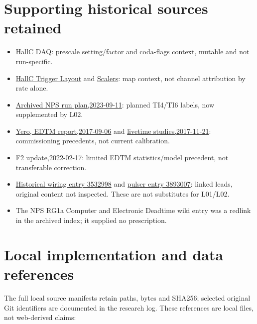 \section{Supporting historical sources retained}
\begin{itemize}
\item \href{https://hallcweb.jlab.org/wiki/index.php?title=Hall_C_DAQ}{HallC DAQ}: prescale setting/factor and coda-flags context, mutable and not run-specific.
\item \href{https://hallcweb.jlab.org/wiki/index.php?title=Hall_C_Trigger_Layout}{HallC Trigger Layout} and \href{https://hallcweb.jlab.org/wiki/index.php?title=Scalers}{Scalers}: map context, not channel attribution by rate alone.
\item \href{https://hallcweb.jlab.org/wiki/images/archive/1/10/20230911123553\%21NPS_DVCS_RunPlan.pdf}{Archived NPS run plan,2023-09-11}: planned TI4/TI6 labels, now supplemented by L02.
\item \href{https://raw.githubusercontent.com/JeffersonLab/Hall-C-Trigger-Setup/master/edtm_studies/EDTM_report.pdf}{Yero, EDTM report,2017-09-06} and \href{https://raw.githubusercontent.com/JeffersonLab/Hall-C-Trigger-Setup/master/edtm_studies/EDTM_LT_Studies.pdf}{livetime studies,2017-11-21}: commissioning precedents, not current calibration.
\item \href{https://indico.jlab.org/event/517/contributions/9310/attachments/7536/10488/F2_HallCwinterCollaboration_2022.pdf}{F2 update,2022-02-17}: limited EDTM statistics/model precedent, not transferable correction.
\item \href{https://logbooks.jlab.org/entry/3532998}{Historical wiring entry 3532998} and \href{https://logbooks.jlab.org/entry/3893007}{pulser entry 3893007}: linked leads, original content not inspected. These are not substitutes for L01/L02.
\item The NPS RG1a Computer and Electronic Deadtime wiki entry was a redlink in the archived index; it supplied no prescription.
\end{itemize}
\section{Local implementation and data references}
The full local source manifests retain paths, bytes and SHA256; selected original Git identifiers are documented in the research log. These references are local files, not web-derived claims:


